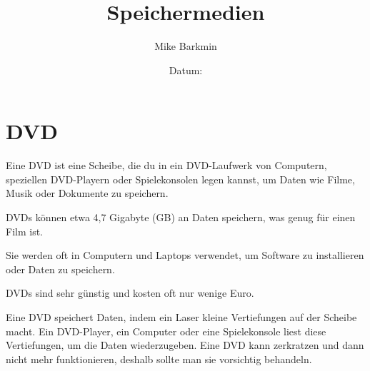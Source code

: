 \documentclass[a4paper,14pt]{scrartcl}
\title{Speichermedien}
\author{Mike Barkmin}
\date{Datum: \hspace{1.5cm}}
\begin{document}
\section*{ DVD}

Eine DVD ist eine Scheibe, die du in ein DVD-Laufwerk von Computern, speziellen DVD-Playern oder Spielekonsolen legen kannst, um Daten wie Filme, Musik oder Dokumente zu speichern. 

DVDs können etwa 4,7 Gigabyte (GB) an Daten speichern, was genug für einen Film ist. 

Sie werden oft in Computern und Laptops verwendet, um Software zu installieren oder Daten zu speichern. 

DVDs sind sehr günstig und kosten oft nur wenige Euro.

Eine DVD speichert Daten, indem ein Laser kleine Vertiefungen auf der Scheibe macht. Ein DVD-Player, ein Computer oder eine Spielekonsole liest diese Vertiefungen, um die Daten wiederzugeben. Eine DVD kann zerkratzen und dann nicht mehr funktionieren, deshalb sollte man sie vorsichtig behandeln.
\end{document}
